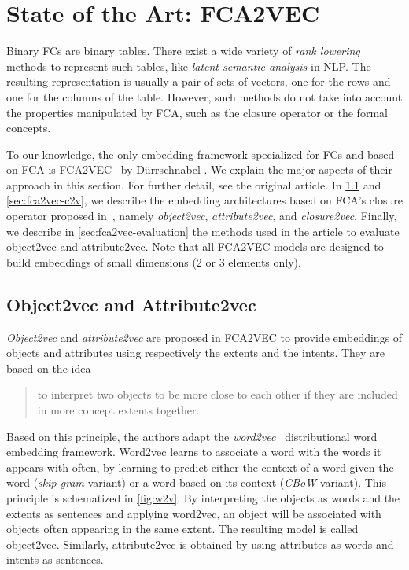 \section{State of the Art: FCA2VEC\label{sec:fca2vec}}

Binary FCs are binary tables. There exist a wide variety of \textit{rank lowering} methods to represent such tables, like \textit{latent semantic analysis} in NLP.
The resulting representation is usually a pair of sets of vectors, one for the rows and one for the columns of the table.
However, such methods do not take into account the properties manipulated by FCA, such as the closure operator or the formal concepts.

To our knowledge, the only embedding framework specialized for FCs and based on FCA is FCA2VEC~\cite{fca2vec:2019:durrschnabel} by  Dürrschnabel \etal{}.
We explain the major aspects of their approach in this section. For further detail, see the original article.
In \cref{sec:fca2vec-o2v} and \cref{sec:fca2vec-c2v}, we describe the embedding architectures based on FCA's closure operator proposed in~\cite{fca2vec:2019:durrschnabel}, namely \textit{object2vec}, \textit{attribute2vec}, and \textit{closure2vec}.
Finally, we describe in \cref{sec:fca2vec-evaluation} the methods used in the article to evaluate {object2vec} and {attribute2vec}.
Note that all FCA2VEC models are designed to build embeddings of small dimensions (2 or 3 elements only).

\subsection{{Object2vec} and {Attribute2vec}}\label{sec:fca2vec-o2v}
\textit{Object2vec} and \textit{attribute2vec} are proposed in FCA2VEC to provide embeddings of objects and attributes using respectively the extents and the intents.
They are based on the idea \blockcquote{fca2vec:2019:durrschnabel}{to interpret two objects to be more close to each other if they are included in more concept extents together.}

Based on this principle, the authors adapt the \textit{word2vec}~\cite{word2vec:2013:mikolov} distributional word embedding framework.
{Word2vec} learns to associate a word with the words it appears with often, by learning to predict either the context of a word given the word (\textit{skip-gram} variant) or a word based on its context (\textit{CBoW} variant). This principle is schematized in \cref{fig:w2v}.
By interpreting the objects as words and the extents as sentences and applying {word2vec}, an object will be associated with objects often appearing in the same extent. The resulting model is called {object2vec}.
Similarly, {attribute2vec} is obtained by using attributes as words and intents as sentences. 

